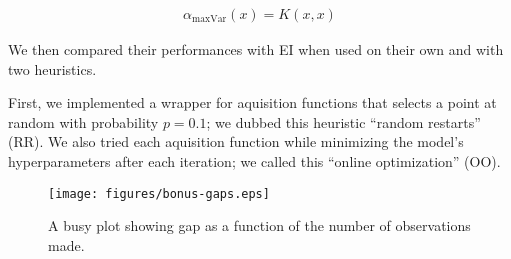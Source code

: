 \documentclass[11pt]{article}
\numberwithin{equation}{section}
\begin{document}
\begin{align}
  \alpha_{\max \text{Var}}(x) = K(x, x)
\end{align}

We then compared their performances
with EI when used on their own and with two heuristics.

First, we implemented a wrapper for aquisition functions that selects a point
at random with probability $p = 0.1$; we dubbed this heuristic ``random
restarts'' (RR). We also tried each aquisition function while minimizing the
model's hyperparameters after each iteration; we called this ``online
optimization'' (OO).

\begin{figure}[H]
  \centering
  \texttt{[image: figures/bonus-gaps.eps]}
  \caption{A busy plot showing gap as a function of the number of
  observations made.}
  \label{fig:bonus-gaps}
\end{figure}
\end{document}
